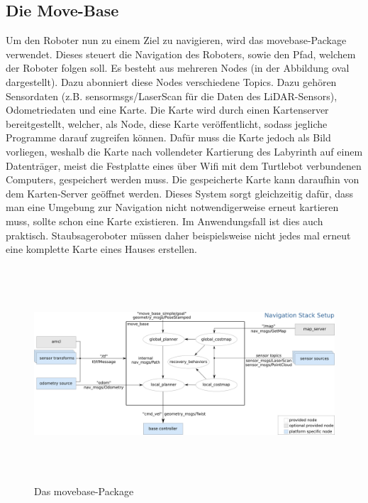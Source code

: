 {{		\subsection{Die Move-Base} %
		{
			Um den Roboter nun zu einem Ziel zu navigieren, wird das move\textunderscore base-Package verwendet. Dieses steuert die Navigation des Roboters, sowie den Pfad, welchem der Roboter folgen soll. Es besteht aus mehreren Nodes (in der Abbildung oval dargestellt).  Dazu abonniert diese Nodes verschiedene Topics. Dazu gehören Sensordaten (z.B. sensor\textunderscore msgs/LaserScan für die Daten des LiDAR-Sensors), Odometriedaten und eine Karte. Die Karte wird durch einen Kartenserver bereitgestellt, welcher, als Node, diese Karte veröffentlicht, sodass jegliche Programme darauf zugreifen können. Dafür muss die Karte jedoch als Bild vorliegen, weshalb die Karte nach vollendeter Kartierung des Labyrinth auf einem Datenträger, meist die Festplatte eines über Wifi mit dem Turtlebot verbundenen Computers, gespeichert werden muss. Die gespeicherte Karte kann daraufhin von dem Karten-Server geöffnet werden. Dieses System sorgt gleichzeitig dafür, dass man eine Umgebung zur Navigation nicht notwendigerweise erneut kartieren muss, sollte schon eine Karte existieren. Im Anwendungsfall ist dies auch praktisch. Staubsageroboter müssen daher beispielsweise nicht jedes mal erneut eine komplette Karte eines Hauses erstellen.
		\begin{figure}[H]
			\centering
			\includegraphics[height=8cm]{Bilder/overview_move_base.png}
			\caption{Das move\textunderscore base-Package \\
			\parencite{movebasenodeoverview}} 
			\label{pic:overviewmovebase}
		\end{figure}
			
}}}
